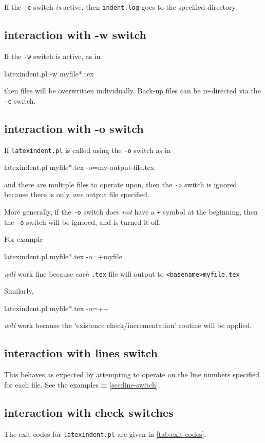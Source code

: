   If the \texttt{-c} switch \emph{is} active, then \texttt{indent.log} goes to the
  specified directory.

 \subsection{interaction with -w switch}
  If the \texttt{-w} switch is active, as in
  \begin{commandshell}
latexindent.pl -w myfile*.tex
\end{commandshell}
  then files will be overwritten individually. Back-up files can be re-directed via the
  \texttt{-c} switch.

 \subsection{interaction with -o switch}
  If \texttt{latexindent.pl} is called using the \texttt{-o} switch as in
  \begin{commandshell}
latexindent.pl myfile*.tex -o=my-output-file.tex 
        \end{commandshell}
  and there are multiple files to operate upon, then the \texttt{-o} switch is ignored
  because there is only \emph{one} output file specified.

  More generally, if the \texttt{-o} switch does \emph{not} have a \texttt{+} symbol at the
  beginning, then the \texttt{-o} switch will be ignored, and is turned it off.

  For example
  \begin{commandshell}
latexindent.pl myfile*.tex -o=+myfile
\end{commandshell}
  \emph{will} work fine because \emph{each} \texttt{.tex} file will output to
  \texttt{<basename>myfile.tex}

  Similarly,
  \begin{commandshell}
latexindent.pl myfile*.tex -o=++
\end{commandshell}
  \emph{will} work because the `existence check/incrementation' routine will be applied.

 \subsection{interaction with lines switch}
  This behaves as expected by attempting to operate on the line numbers specified for each file. See
  the examples in \cref{sec:line-switch}.

 \subsection{interaction with check switches}
  The exit codes for \texttt{latexindent.pl} are given in \vref{tab:exit-codes}.

